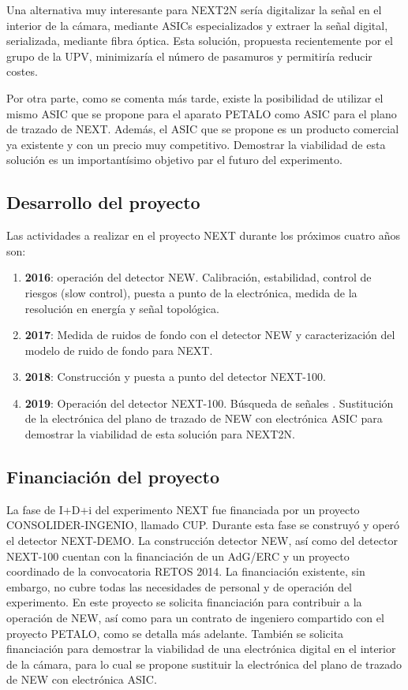 Una alternativa muy interesante para NEXT2N sería digitalizar la señal en el interior de la cámara, mediante ASICs especializados y extraer la señal digital, serializada, mediante fibra óptica. Esta solución, propuesta recientemente por el grupo de la UPV, minimizaría el número de pasamuros y permitiría reducir costes.

Por otra parte, como se comenta más tarde, existe la posibilidad de utilizar el mismo ASIC que se propone para el aparato PETALO como ASIC para el plano de trazado de NEXT. Además, el ASIC que se propone es un producto comercial ya existente y con un precio muy competitivo. Demostrar la viabilidad de esta solución es un importantísimo objetivo par el futuro del experimento. 


\subsection*{Desarrollo del proyecto}
Las actividades a realizar en el proyecto NEXT durante los próximos cuatro años son:
\begin{enumerate}
\item {\bf 2016}: operación del detector NEW. Calibración, estabilidad, control de riesgos (slow control), puesta a punto de la electrónica, medida de la resolución en energía y señal topológica.
\item {\bf 2017}: Medida de ruidos de fondo con el detector NEW y caracterización del modelo de ruido de fondo para NEXT. 
\item {\bf 2018}: Construcción y puesta a punto del detector NEXT-100. 
\item {\bf 2019}: Operación del detector NEXT-100. Búsqueda de señales \bbonu.  Sustitución de la electrónica del plano de trazado de NEW con electrónica ASIC para demostrar la viabilidad de esta solución para NEXT2N. 


\end{enumerate}

\subsection*{Financiación del proyecto}

La fase de I+D+i del experimento NEXT fue financiada por un proyecto CONSOLIDER-INGENIO, llamado CUP. Durante esta fase se construyó y operó el detector NEXT-DEMO. La construcción  detector NEW, así como del detector NEXT-100 cuentan con la financiación de un AdG/ERC y un proyecto coordinado de la convocatoria RETOS 2014. La financiación existente, sin embargo, no cubre todas las necesidades de personal y de operación del experimento. En este proyecto se solicita financiación para contribuir a la operación de NEW, así como para un contrato de ingeniero compartido con el proyecto PETALO, como se detalla más adelante. También se solicita financiación para demostrar la viabilidad de una electrónica digital en el interior de la cámara, para lo cual se propone sustituir la electrónica del plano de trazado de NEW con electrónica ASIC. 


